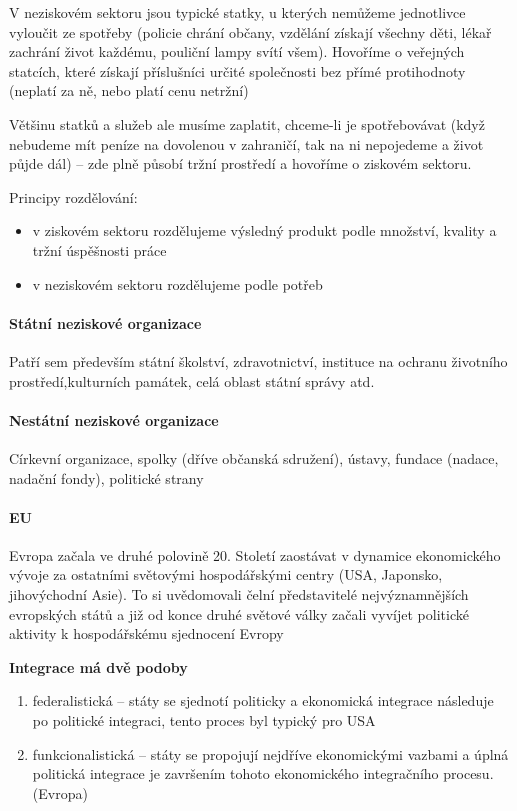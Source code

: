 V neziskovém sektoru jsou typické statky, u kterých nemůžeme jednotlivce vyloučit ze spotřeby (policie chrání občany, vzdělání získají všechny děti, lékař zachrání život každému, pouliční lampy svítí všem). Hovoříme o veřejných statcích, které získají příslušníci určité společnosti bez přímé protihodnoty (neplatí za ně, nebo platí cenu netržní)

Většinu statků a služeb ale musíme zaplatit, chceme-li je spotřebovávat (když nebudeme mít peníze na dovolenou v zahraničí, tak na ni nepojedeme a život půjde dál) -- zde plně působí tržní prostředí a hovoříme o ziskovém sektoru.

Principy rozdělování:
\begin{itemize}
    \item v ziskovém sektoru rozdělujeme výsledný produkt podle množství, kvality a tržní úspěšnosti práce
    \item v neziskovém sektoru rozdělujeme podle potřeb
\end{itemize}

\paragraph{Státní neziskové organizace}
Patří sem především státní školství, zdravotnictví, instituce na ochranu životního prostředí,kulturních památek, celá oblast státní správy atd.

\paragraph{Nestátní neziskové organizace}
Církevní organizace, spolky (dříve občanská sdružení), ústavy, fundace (nadace, nadační fondy), politické strany

\paragraph{EU}
Evropa začala ve druhé polovině 20. Století zaostávat v dynamice ekonomického vývoje za ostatními světovými hospodářskými centry (USA, Japonsko, jihovýchodní Asie). To si uvědomovali čelní představitelé nejvýznamnějších evropských států a již od konce druhé světové války začali vyvíjet politické aktivity k hospodářskému sjednocení Evropy

\textbf{Integrace má dvě podoby}
\begin{enumerate}   
    \item federalistická -- státy se sjednotí politicky a ekonomická integrace následuje po politické integraci, tento proces byl typický pro USA
    \item funkcionalistická -- státy se propojují nejdříve ekonomickými vazbami a úplná politická integrace je završením tohoto ekonomického integračního procesu. (Evropa)
\end{enumerate}

